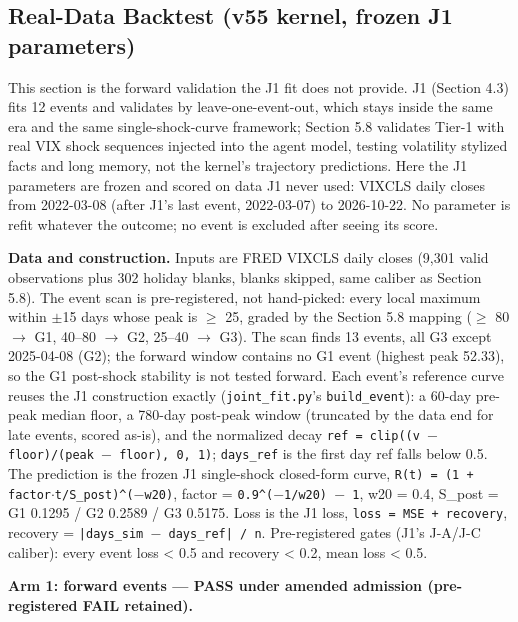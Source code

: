 \documentclass[11pt]{article}
\begin{document}
\subsection{Real-Data Backtest (v55 kernel, frozen J1 parameters)}
This section is the forward validation the J1 fit does not provide. J1 (Section 4.3) fits 12 events and validates by leave-one-event-out, which stays inside the same era and the same single-shock-curve framework; Section 5.8 validates Tier-1 with real VIX shock sequences injected into the agent model, testing volatility stylized facts and long memory, not the kernel's trajectory predictions. Here the J1 parameters are frozen and scored on data J1 never used: VIXCLS daily closes from 2022-03-08 (after J1's last event, 2022-03-07) to 2026-10-22. No parameter is refit whatever the outcome; no event is excluded after seeing its score.

\textbf{Data and construction.} Inputs are FRED VIXCLS daily closes (9,301 valid observations plus 302 holiday blanks, blanks skipped, same caliber as Section 5.8). The event scan is pre-registered, not hand-picked: every local maximum within $\pm$15 days whose peak is $\geq$ 25, graded by the Section 5.8 mapping ($\geq$ 80 $\rightarrow$ G1, 40--80 $\rightarrow$ G2, 25--40 $\rightarrow$ G3). The scan finds 13 events, all G3 except 2025-04-08 (G2); the forward window contains no G1 event (highest peak 52.33), so the G1 post-shock stability is not tested forward. Each event's reference curve reuses the J1 construction exactly (\texttt{joint\_fit.py}'s \texttt{build\_event}): a 60-day pre-peak median floor, a 780-day post-peak window (truncated by the data end for late events, scored as-is), and the normalized decay \texttt{ref = clip((v $-$ floor)/(peak $-$ floor), 0, 1)}; \texttt{days\_ref} is the first day ref falls below 0.5. The prediction is the frozen J1 single-shock closed-form curve, \texttt{R(t) = (1 + factor$\cdot$t/S\_post)\^{}($-$w20)}, factor = \texttt{0.9\^{}($-$1/w20) $-$ 1}, w20 = 0.4, S\_post = G1 0.1295 / G2 0.2589 / G3 0.5175. Loss is the J1 loss, \texttt{loss = MSE + recovery}, recovery = \texttt{|days\_sim $-$ days\_ref| / n}. Pre-registered gates (J1's J-A/J-C caliber): every event loss < 0.5 and recovery < 0.2, mean loss < 0.5.

\textbf{Arm 1: forward events --- PASS under amended admission (pre-registered FAIL retained).}
\end{document}
